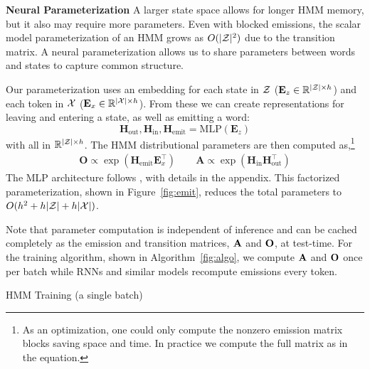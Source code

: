 \documentclass[11pt,a4paper]{article}
\begin{document}
\vspace{0.2cm}

\noindent
\textbf{Neural Parameterization}
A larger state space allows for longer HMM memory, but it also may require 
more parameters.
Even with blocked emissions, the scalar model parameterization of an HMM grows
as $O(|\mathcal{Z}|^2)$ due to the transition matrix. A neural parameterization allows us to 
share parameters between words and states to capture common structure. 

Our parameterization uses an embedding for each state in
$\mathcal{Z}$ ($\mathbf{E}_z \in \mathbb{R}^{|\mathcal{Z}| \times h}$)
and each token in $\mathcal{X}$ ($\mathbf{E}_x \in \mathbb{R}^{|\mathcal{X}| \times h}$).
From these we can create representations for leaving and entering a state,
as well as emitting a word: 
\[ \mathbf{H}_{\textrm{out}},\mathbf{H}_{\textrm{in}},\mathbf{H}_\textrm{emit}
 = \text{MLP}( \mathbf{E}_z ) \] 
with all in $\mathbb{R}^{|\mathcal{Z}|\times h}$.
The HMM distributional parameters are then computed as,\footnote{
As an optimization, one could only compute the nonzero emission matrix blocks saving space and time.
In practice we compute the full matrix as in the equation.
} 
\begin{equation}
\begin{aligned}
\mathbf{O} \propto \exp (\mathbf{H}_\textrm{emit}\mathbf{E}_x ^\top) \qquad
\mathbf{A} \propto \exp (\mathbf{H}_\textrm{in}\mathbf{H}_\textrm{out}^\top)
\end{aligned}
\end{equation}
The MLP architecture follows \citet{kim2019cpcfg}, with details in the appendix.
This factorized parameterization, shown in Figure~\ref{fig:emit},
reduces the total parameters to  $O(h^2 + h|\mathcal{Z}| + h|\mathcal{X}|)$.

Note that parameter computation is independent of inference
and can be cached completely as the emission and transition matrices, $\mathbf{A}$ and $\mathbf{O}$, at test-time.
For the training algorithm, shown in Algorithm~\ref{fig:algo}, we compute $\mathbf{A}$ and $\mathbf{O}$ once per batch
while RNNs and similar models recompute emissions every token.

\begin{algorithm}[t]
\begin{algorithmic}
    \EndFor
\end{algorithmic}
\caption{
\label{fig:algo}
HMM Training (a single batch)
}
\end{algorithm}
\end{document}
